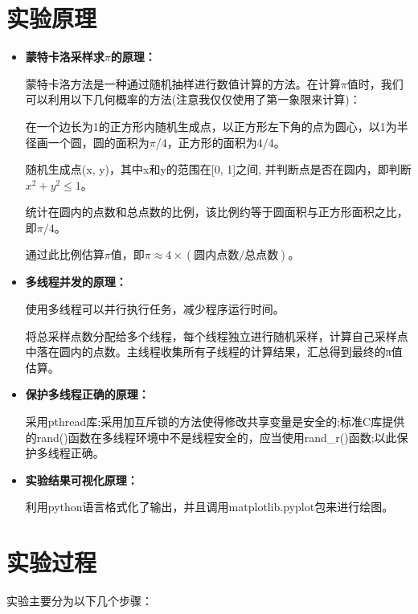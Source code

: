 \documentclass{LabReport}
\begin{document}
	\section{实验原理}
	\begin{itemize}
		\item \textbf{蒙特卡洛采样求$\pi$的原理：}
		\par\hspace{2em}
		蒙特卡洛方法是一种通过随机抽样进行数值计算的方法。在计算$\pi$值时，我们可以利用以下几何概率的方法(注意我仅仅使用了第一象限来计算)：\par\hspace{2em}
		在一个边长为1的正方形内随机生成点，以正方形左下角的点为圆心，以1为半径画一个圆，圆的面积为$\pi$/4，正方形的面积为4/4。\par\hspace{2em}
		随机生成点(x, y)，其中x和y的范围在[0, 1]之间, 并判断点是否在圆内，即判断$x^2 + y^2 \leq 1$。\par\hspace{2em}
		统计在圆内的点数和总点数的比例，该比例约等于圆面积与正方形面积之比，即$\pi / 4$。\par\hspace{2em}
		通过此比例估算$\pi$值，即$\pi \approx 4 \times (\text{圆内点数} / \text{总点数})$。
		
		\item \textbf{多线程并发的原理：} \par\hspace{2em}使用多线程可以并行执行任务，减少程序运行时间。 \par\hspace{2em}
		将总采样点数分配给多个线程，每个线程独立进行随机采样，计算自己采样点中落在圆内的点数。主线程收集所有子线程的计算结果，汇总得到最终的π值估算。
		\item \textbf{保护多线程正确的原理：}
		\par\hspace{2em}
		采用pthread库;采用加互斥锁的方法使得修改共享变量是安全的;标准C库提供的rand()函数在多线程环境中不是线程安全的，应当使用rand\_r()函数;以此保护多线程正确。
		
		\item \textbf{实验结果可视化原理：}
		\par\hspace{2em}利用python语言格式化了输出，并且调用matplotlib.pyplot包来进行绘图。
		
	\end{itemize}
	
	\section{实验过程}
	\par\hspace{0em}实验主要分为以下几个步骤：
	
\end{document}
